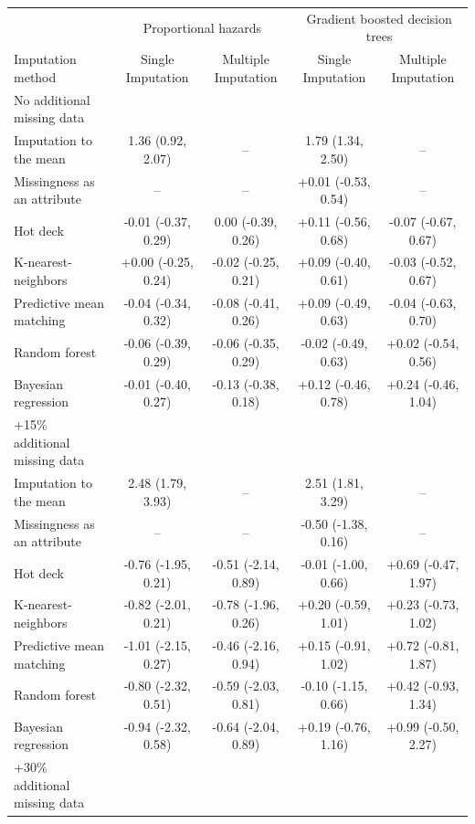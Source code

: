 \documentclass{article}
\begin{document}
\begin{table}
\begin{tabular}{lcccc}
\toprule
& \multicolumn{2}{c}{Proportional hazards} & \multicolumn{2}{c}{Gradient boosted decision trees} \\ 
 \cmidrule(lr){2-3}\cmidrule(lr){4-5}
Imputation method & Single Imputation & Multiple Imputation & Single Imputation & Multiple Imputation \\ 
\midrule
\multicolumn{1}{l}{No additional missing data} \\ 
\midrule
Imputation to the mean & 1.36 (0.92, 2.07) & -- & 1.79 (1.34, 2.50) & -- \\ 
Missingness as an attribute & -- & -- & +0.01 (-0.53, 0.54) & -- \\ 
Hot deck & -0.01 (-0.37, 0.29) & 0.00 (-0.39, 0.26) & +0.11 (-0.56, 0.68) & -0.07 (-0.67, 0.67) \\ 
K-nearest-neighbors & +0.00 (-0.25, 0.24) & -0.02 (-0.25, 0.21) & +0.09 (-0.40, 0.61) & -0.03 (-0.52, 0.67) \\ 
Predictive mean matching & -0.04 (-0.34, 0.32) & -0.08 (-0.41, 0.26) & +0.09 (-0.49, 0.63) & -0.04 (-0.63, 0.70) \\ 
Random forest & -0.06 (-0.39, 0.29) & -0.06 (-0.35, 0.29) & -0.02 (-0.49, 0.63) & +0.02 (-0.54, 0.56) \\ 
Bayesian regression & -0.01 (-0.40, 0.27) & -0.13 (-0.38, 0.18) & +0.12 (-0.46, 0.78) & +0.24 (-0.46, 1.04) \\ 
\midrule
\multicolumn{1}{l}{+15\% additional missing data} \\ 
\midrule
Imputation to the mean & 2.48 (1.79, 3.93) & -- & 2.51 (1.81, 3.29) & -- \\ 
Missingness as an attribute & -- & -- & -0.50 (-1.38, 0.16) & -- \\ 
Hot deck & -0.76 (-1.95, 0.21) & -0.51 (-2.14, 0.89) & -0.01 (-1.00, 0.66) & +0.69 (-0.47, 1.97) \\ 
K-nearest-neighbors & -0.82 (-2.01, 0.21) & -0.78 (-1.96, 0.26) & +0.20 (-0.59, 1.01) & +0.23 (-0.73, 1.02) \\ 
Predictive mean matching & -1.01 (-2.15, 0.27) & -0.46 (-2.16, 0.94) & +0.15 (-0.91, 1.02) & +0.72 (-0.81, 1.87) \\ 
Random forest & -0.80 (-2.32, 0.51) & -0.59 (-2.03, 0.81) & -0.10 (-1.15, 0.66) & +0.42 (-0.93, 1.34) \\ 
Bayesian regression & -0.94 (-2.32, 0.58) & -0.64 (-2.04, 0.89) & +0.19 (-0.76, 1.16) & +0.99 (-0.50, 2.27) \\ 
\midrule
\multicolumn{1}{l}{+30\% additional missing data} \\ 

\end{tabular}
\end{table}
\end{document}
